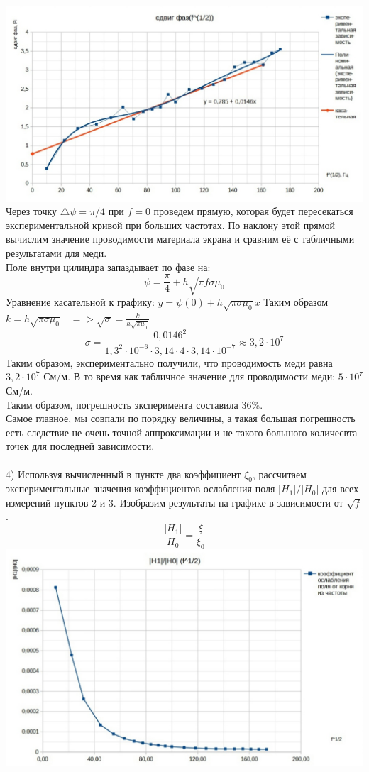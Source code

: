 \documentclass[a4paper]{article}
\begin{document}
\\
\includegraphics[width=18cm]{g4}\\
Через точку $\triangle \psi = \pi /4$ при $f = 0$ проведем прямую, которая будет пересекаться экспериментальной кривой при больших частотах. По наклону этой прямой вычислим значение проводимости материала экрана и сравним её с табличными результатами для меди. \\
Поле внутри цилиндра запаздывает по фазе на:
$$\psi = \frac{\pi}{4} + h\sqrt{\pi f \sigma \mu_0}$$
Уравнение касательной к графику: $y = \psi(0) + h\sqrt{\pi \sigma \mu_0}x $
Таким образом $k = h\sqrt{\pi \sigma \mu_0} \; \; \; => \sqrt{\sigma} = \frac{k}{h\sqrt{\pi \mu_0}}$\\
$$\sigma = \frac{0,0146^2}{1,3^2 \cdot 10^{-6} \cdot 3,14 \cdot 4 \cdot 3,14 \cdot 10^{-7}} \approx 3,2 \cdot 10^7 $$
Таким образом, экспериментально получили, что проводимость меди равна $3,2 \cdot 10^7$ См/м. В то время как табличное значение для проводимости меди: $5 \cdot 10^7$ См/м.\\
Таким образом, погрешность эксперимента составила $36 \%$. \\
Самое главное, мы совпали по порядку величины, а такая большая погрешность есть следствие не очень точной аппроксимации и не такого большого количесвта точек для последней зависимости.\\
\\
4) Используя вычисленный в пункте два коэффициент $\xi_0$, рассчитаем экспериментальные значения коэффициентов ослабления поля $|H_1|/|H_0|$ для всех измерений пунктов 2 и 3. Изобразим результаты на графике в зависимости от $\sqrt{f}$. \\
$$ \frac{|H_1|}{H_0} = \frac{\xi}{\xi_0}$$
\includegraphics[width=18cm]{g5}\\
\end{document}

